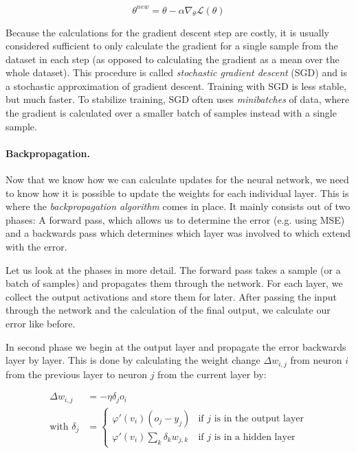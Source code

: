\begin{equation*}
  \theta^{new} = \theta - \alpha \nabla_\theta \mathcal{L}(\theta)
\end{equation*}

Because the calculations for the gradient descent step are costly, it is usually considered sufficient to only calculate the gradient for a single sample from the dataset in each step (as opposed to calculating the gradient as a mean over the whole dataset). This procedure is called \textit{stochastic gradient descent} (SGD) and is a stochastic approximation of gradient descent. Training with SGD is less stable, but much faster. To stabilize training, SGD often uses \textit{minibatches} of data, where the gradient is calculated over a smaller batch of samples instead with a single sample.

\paragraph{Backpropagation.} Now that we know how we can calculate updates for the neural network, we need to know how it is possible to update the weights for each individual layer. This is where the \textit{backpropagation algorithm} comes in place. It mainly consists out of two phases: A forward pass, which allows us to determine the error (e.g. using MSE) and a backwards pass which determines which layer was involved to which extend with the error.

Let us look at the phases in more detail. The forward pass takes a sample (or a batch of samples) and propagates them through the network. For each layer, we collect the output activations and store them for later. After passing the input through the network and the calculation of the final output, we calculate our error like before. 

In second phase we begin at the output layer and propagate the error backwards layer by layer. This is done by calculating the weight change $\Delta w_{i, j}$ from neuron $i$ from the previous layer to neuron $j$ from the current layer by:

\begin{align*}
  \Delta w_{i, j} &= -\eta \delta_j o_i \\
  \text{with } \delta_j &= \begin{cases}
    \varphi'(v_i)(o_j - y_j) & \text{if $j$ is in the output layer}  \\
    \varphi'(v_i) \sum_k \delta_k w_{j,k} & \text{if $j$ is in a hidden layer}
  \end{cases}
\end{align*}

